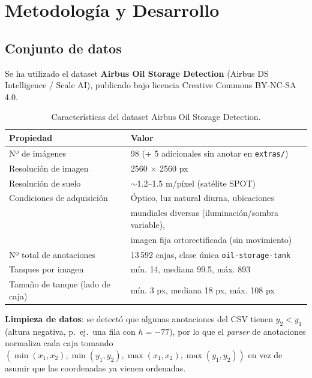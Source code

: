 \documentclass[11pt,a4paper]{article}
\begin{document}
\section{Metodología y Desarrollo}

\subsection{Conjunto de datos}

Se ha utilizado el dataset \textbf{Airbus Oil Storage Detection}
\cite{airbus_dataset} (Airbus DS Intelligence / Scale AI), publicado bajo licencia
Creative Commons BY-NC-SA 4.0.

\begin{table}[h!]
\centering
\begin{tabular}{@{}ll@{}}
\toprule
\textbf{Propiedad} & \textbf{Valor} \\
\midrule
Nº de imágenes & 98 (+ 5 adicionales sin anotar en \texttt{extras/}) \\
Resolución de imagen & 2560 $\times$ 2560 px \\
Resolución de suelo & $\sim$1.2--1.5 m/píxel (satélite SPOT) \\
Condiciones de adquisición & Óptico, luz natural diurna, ubicaciones \\
 & mundiales diversas (iluminación/sombra variable), \\
 & imagen fija ortorectificada (sin movimiento) \\
Nº total de anotaciones & 13\,592 cajas, clase única \texttt{oil-storage-tank} \\
Tanques por imagen & mín. 14, mediana 99.5, máx. 893 \\
Tamaño de tanque (lado de caja) & mín. 3 px, mediana 18 px, máx. 108 px \\
\bottomrule
\end{tabular}
\caption{Características del dataset Airbus Oil Storage Detection.}
\label{tab:dataset}
\end{table}

\textbf{Limpieza de datos}: se detectó que algunas anotaciones del CSV tienen
$y_2 < y_1$ (altura negativa, p.\ ej.\ una fila con $h = -77$), por lo que el
\emph{parser} de anotaciones normaliza cada caja tomando
$(\min(x_1,x_2), \min(y_1,y_2), \max(x_1,x_2), \max(y_1,y_2))$ en vez de asumir que
las coordenadas ya vienen ordenadas.
\end{document}
